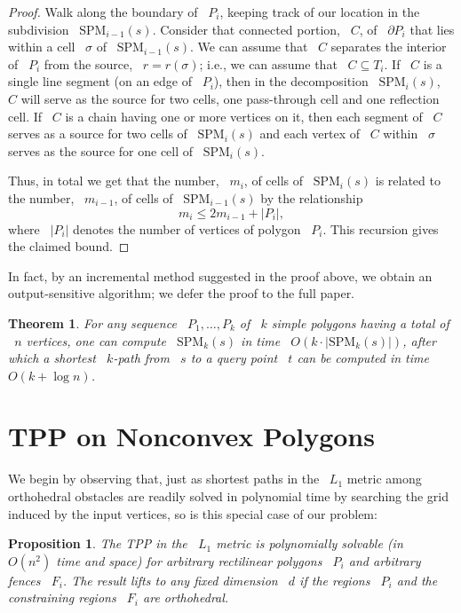 \documentclass[11pt]{article}
\newtheorem{theorem}{Theorem}
\newtheorem{proposition}{Proposition}
\begin{document}
\begin{proof}
Walk along the boundary of ~\(P_i\), keeping track of our location in the subdivision ~\(\text{SPM}_{i-1}(s)\).
Consider that connected portion, ~\(C\), of ~\(\partial P_i\) that lies within a cell ~\(\sigma\) of ~\(\text{SPM}_{i-1}(s)\).
We can assume that ~\(C\) separates the interior of ~\(P_i\) from the source, ~\(r = r(\sigma)\); i.e., we can assume that ~\(C \subseteq T_i\).
If ~\(C\) is a single line segment (on an edge of ~\(P_i\)), then in the decomposition ~\(\text{SPM}_i(s)\), ~\(C\) will serve as the source for two cells, one pass-through cell and one reflection cell.
If ~\(C\) is a chain having one or more vertices on it, then each segment of ~\(C\) serves as a source for two cells of ~\(\text{SPM}_i(s)\) and each vertex of ~\(C\) within ~\(\sigma\) serves as the source for one cell of ~\(\text{SPM}_i(s)\).

Thus, in total we get that the number, ~\(m_i\), of cells of ~\(\text{SPM}_i(s)\) is related to the number, ~\(m_{i-1}\), of cells of ~\(\text{SPM}_{i-1}(s)\) by the relationship
\[
	m_i \le 2m_{i-1} + |P_i|,
\]
where ~\(|P_i|\) denotes the number of vertices of polygon ~\(P_i\).
This recursion gives the claimed bound.
\end{proof}

In fact, by an incremental method suggested in the proof above, we obtain an output-sensitive algorithm; we defer the proof to the full paper.

\begin{theorem}
For any sequence ~\(P_1, \ldots, P_k\) of ~\(k\) simple polygons having a total of ~\(n\) vertices, one can compute ~\(\text{SPM}_k(s)\) in time ~\(O(k \cdot |\text{SPM}_k(s)|)\), after which a shortest ~\(k\)-path from ~\(s\) to a query point ~\(t\) can be computed in time ~\(O(k + \log n)\).
\end{theorem}

\section{TPP on Nonconvex Polygons}

We begin by observing that, just as shortest paths in the ~\(L_1\) metric among orthohedral obstacles are readily solved in polynomial time by searching the grid induced by the input vertices, so is this special case of our problem:

\begin{proposition}
The TPP in the ~\(L_1\) metric is polynomially solvable (in ~\(O(n^2)\) time and space) for arbitrary rectilinear polygons ~\(P_i\) and arbitrary fences ~\(F_i\). The result lifts to any fixed dimension ~\(d\) if the regions ~\(P_i\) and the constraining regions ~\(F_i\) are orthohedral.
\end{proposition}
\end{document}
